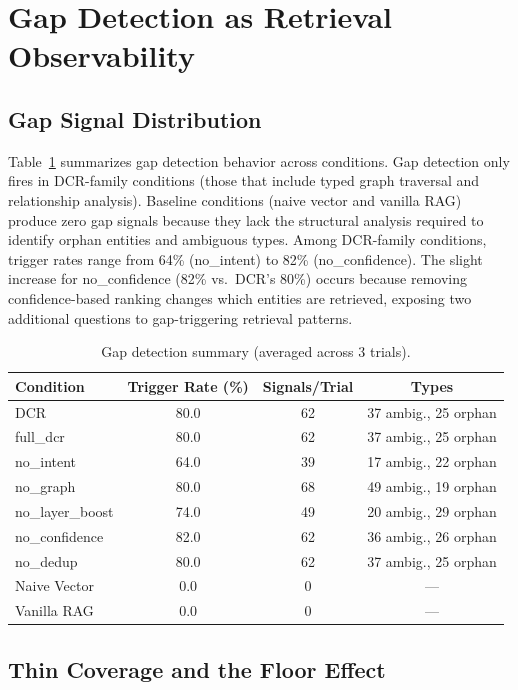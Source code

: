 \documentclass[11pt,a4paper]{article}
\begin{document}
\section{Gap Detection as Retrieval Observability}
\label{sec:gaps}

\subsection{Gap Signal Distribution}

Table~\ref{tab:gaps} summarizes gap detection behavior across conditions. Gap detection only fires in DCR-family conditions (those that include typed graph traversal and relationship analysis). Baseline conditions (naive vector and vanilla RAG) produce zero gap signals because they lack the structural analysis required to identify orphan entities and ambiguous types. Among DCR-family conditions, trigger rates range from 64\% (no\_intent) to 82\% (no\_confidence). The slight increase for no\_confidence (82\% vs.\ DCR's 80\%) occurs because removing confidence-based ranking changes which entities are retrieved, exposing two additional questions to gap-triggering retrieval patterns.

\begin{table}[t]
\centering
\caption{Gap detection summary (averaged across 3 trials).}
\label{tab:gaps}
\begin{tabular}{@{}lccc@{}}
\toprule
Condition & Trigger Rate (\%) & Signals/Trial & Types \\
\midrule
DCR & 80.0 & 62 & 37 ambig., 25 orphan \\
full\_dcr & 80.0 & 62 & 37 ambig., 25 orphan \\
no\_intent & 64.0 & 39 & 17 ambig., 22 orphan \\
no\_graph & 80.0 & 68 & 49 ambig., 19 orphan \\
no\_layer\_boost & 74.0 & 49 & 20 ambig., 29 orphan \\
no\_confidence & 82.0 & 62 & 36 ambig., 26 orphan \\
no\_dedup & 80.0 & 62 & 37 ambig., 25 orphan \\
\addlinespace
Naive Vector & 0.0 & 0 & --- \\
Vanilla RAG & 0.0 & 0 & --- \\
\bottomrule
\end{tabular}
\end{table}

\subsection{Thin Coverage and the Floor Effect}
\end{document}
